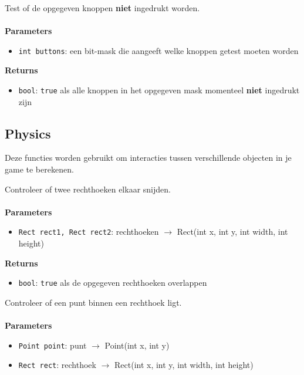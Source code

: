 \documentclass[11pt,fleqn]{book} %
\begin{document}
\begin{libf}
	Test of de opgegeven knoppen \textbf{niet} ingedrukt worden.\\ \\
	\textbf{Parameters}
	\begin{itemize}
		\item \texttt{int buttons}: een bit-mask die aangeeft welke knoppen getest moeten worden
	\end{itemize}
	\textbf{Returns}
	\begin{itemize}
		\item \texttt{bool}: \texttt{true} als alle knoppen in het opgegeven mask momenteel \textbf{niet} ingedrukt zijn
	\end{itemize}
\end{libf}

\newpage

\subsection{Physics}
Deze functies worden gebruikt om interacties tussen verschillende objecten in je game te berekenen.

\begin{libf}
	Controleer of twee rechthoeken elkaar snijden.\\ \\
	\textbf{Parameters}	
	\begin{itemize}
		\item \texttt{Rect rect1, Rect rect2}: rechthoeken $\rightarrow$ Rect(int x, int y, int width, int height)
	\end{itemize}
	\textbf{Returns}
	\begin{itemize}
		\item \texttt{bool}: \texttt{true} als de opgegeven rechthoeken overlappen
	\end{itemize}
\end{libf}

\begin{libf}
	Controleer of een punt binnen een rechthoek ligt.\\ \\
	\textbf{Parameters}
	\begin{itemize}
		\item \texttt{Point point}: punt $\rightarrow$ Point(int x, int y)
		\item \texttt{Rect rect}: rechthoek $\rightarrow$ Rect(int x, int y, int width, int height)
	\end{itemize}
\end{libf}
\end{document}
